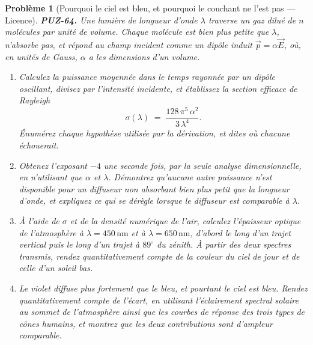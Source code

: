 \documentclass[11pt]{article}
\newtheorem{problem}{Problème}
\begin{document}
\begin{problem}[{Pourquoi le ciel est bleu, et pourquoi le couchant ne l'est pas --- Licence}]
\textbf{PUZ-64.} Une lumière de longueur d'onde $ \lambda $ traverse un gaz dilué de
$ n $ molécules par unité de volume. Chaque molécule est bien plus petite que
$ \lambda $, n'absorbe pas, et répond au champ incident comme un dipôle induit
$ \vec{p} = \alpha \vec{E} $, où, en unités de Gauss, $ \alpha $ a les dimensions d'un
volume.
\begin{enumerate}
\item[(a)] Calculez la puissance moyennée dans le temps rayonnée par un dipôle oscillant, divisez
par l'intensité incidente, et établissez la section efficace de Rayleigh
\[ \sigma(\lambda) \;=\; \frac{128\,\pi^{5}\,\alpha^{2}}{3\,\lambda^{4}} . \]
Énumérez chaque hypothèse utilisée par la dérivation, et dites où chacune échouerait.
\item[(b)] Obtenez l'exposant $ -4 $ une seconde fois, par la seule analyse dimensionnelle, en
n'utilisant que $ \alpha $ et $ \lambda $. Démontrez qu'aucune autre puissance n'est
disponible pour un diffuseur non absorbant bien plus petit que la longueur d'onde, et
expliquez ce qui se dérègle lorsque le diffuseur est comparable à $ \lambda $.
\item[(c)] À l'aide de $ \sigma $ et de la densité numérique de l'air, calculez l'épaisseur
optique de l'atmosphère à $ \lambda = 450\,\mathrm{nm} $ et à
$ \lambda = 650\,\mathrm{nm} $, d'abord le long d'un trajet vertical puis le long d'un
trajet à $ 89^\circ $ du zénith. À partir des deux spectres transmis, rendez
quantitativement compte de la couleur du ciel de jour et de celle d'un soleil bas.
\item[(d)] Le violet diffuse plus fortement que le bleu, et pourtant le ciel est bleu. Rendez
quantitativement compte de l'écart, en utilisant l'éclairement spectral solaire au sommet de
l'atmosphère ainsi que les courbes de réponse des trois types de cônes humains, et montrez
que les deux contributions sont d'ampleur comparable.
\end{enumerate}

\end{problem}
\end{document}
